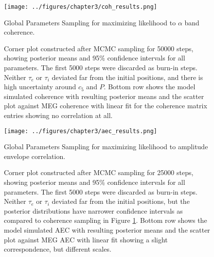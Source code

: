 \begin{figure}[htbp]
    \centering
    \texttt{[image: ../figures/chapter3/coh\_results.png]}
    \caption{Global Parameters Sampling for maximizing likelihood to $\alpha$ band coherence.}
    \caption*{Corner plot constructed after MCMC sampling for 50000 steps, showing posterior means and 95\% confidence intervals for all parameters. The first 5000 steps were discarded as burn-in steps. Neither $\tau_e$ or $\tau_i$ deviated far from the initial positions, and there is high uncertainty around $c_5$ and $P$. Bottom row shows the model simulated coherence with resulting posterior means and the scatter plot against MEG coherence with linear fit for the coherence matrix entries showing no correlation at all.}
    \label{fig:coh_hopf}
\end{figure}

\begin{figure}[htbp]
    \centering
    \texttt{[image: ../figures/chapter3/aec\_results.png]}
    \caption{Global Parameters Sampling for maximizing likelihood to amplitude envelope correlation.}
    \caption*{Corner plot constructed after MCMC sampling for 25000 steps, showing posterior means and 95\% confidence intervals for all parameters. The first 5000 steps were discarded as burn-in steps. Neither $\tau_e$ or $\tau_i$ deviated far from the initial positions, but the posterior distributions have narrower confidence intervals as compared to coherence sampling in Figure \ref{fig:coh_hopf}. Bottom row shows the model simulated AEC with resulting posterior means and the scatter plot against MEG AEC with linear fit showing a slight correspondence, but different scales.}
    \label{fig:aec_hopf}
\end{figure}